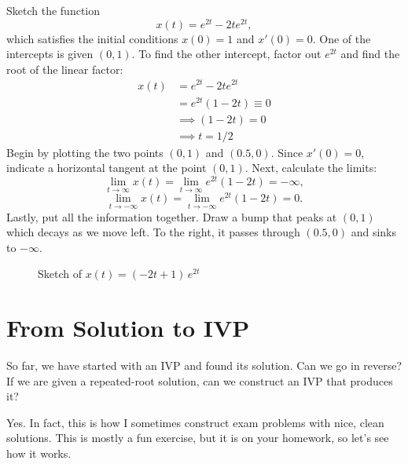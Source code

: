 \documentclass[10pt,letterpaper]{article}
\begin{document}
\begin{example}[2]{
Sketch the function
\[
x(t)=e^{2t}-2te^{2t},
\]
which satisfies the initial conditions
$x(0)=1$ and $x'(0)=0$.
}
One of the intercepts is given $(0,1)$. To find the other intercept, factor out $e^{2t}$ and find the root of the linear factor:
\begin{align*}
x(t)&=    e^{2t} - 2te^{2t}\\
&=e^{2t}(1-2t) \equiv0\\
&\implies (1-2t)=0\\
&\implies t=1/2
\end{align*}
Begin by plotting the two points $(0,1)$ and $(0.5,0)$. Since $x'(0)=0$, indicate a horizontal tangent at the point $(0,1).$ Next, calculate the limits:
$$
 \lim_{t\rightarrow \infty} x(t) =  \lim_{t\rightarrow \infty} e^{2t}(1-2t) = -\infty,
$$
$$
 \lim_{t\rightarrow -\infty} x(t) =\lim_{t\rightarrow -\infty} e^{2t}(1-2t) = 0.
$$
Lastly, put all the information together. Draw a bump that peaks at $(0,1)$ which decays as we move left. To the right, it passes through $(0.5,0)$ and sinks to $-\infty$.
\begin{figure}[H]
    \centering
    \caption{ Sketch of $x(t)=(-2t+1)\,e^{2t}$}
    \label{fig:placeholder}
\end{figure}
\end{example}


\section{From Solution to IVP}

So far, we have started with an IVP and found its solution. Can we go
in reverse? If we are given a repeated-root solution, can we construct
an IVP that produces it?

Yes. In fact, this is how I sometimes construct exam
problems with nice, clean solutions. This is mostly a fun exercise, but it is on your homework, so let's see how it works.
\end{document}
